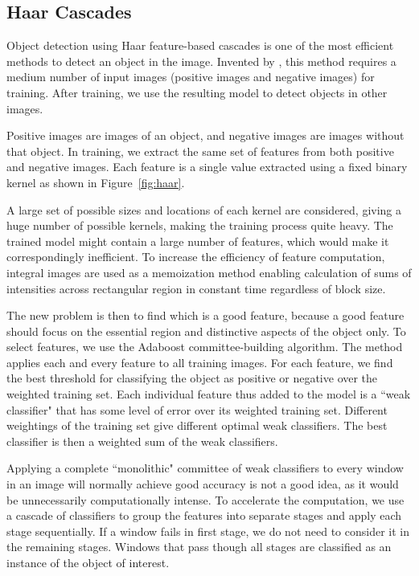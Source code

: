 \subsection{Haar Cascades}
Object detection using Haar feature-based cascades is one of the most efficient methods to detect an object in the image. Invented by , this method requires a medium number of input images (positive images and negative images) for training. After training, we use the resulting model to detect objects in other images.

Positive images are images of an object, and negative images are images without that object. In training, we extract the same set of features from both positive and negative images. Each feature is a single value extracted using a fixed binary kernel as shown in Figure~\ref{fig:haar}.

A large set of possible sizes and locations of each kernel are considered, giving a huge number of possible kernels, making the training process quite heavy. The trained model might contain a large number of features, which would make it correspondingly inefficient. To increase the efficiency of feature computation, integral images are used as a memoization method enabling calculation of sums of intensities across rectangular region in constant time regardless of block size. 

The new problem is then to find which is a good feature, because a good feature should focus on the essential region and distinctive aspects of the object only. To select features, we use the Adaboost committee-building algorithm. The method applies each and every feature to all training images. For each feature, we find the best threshold for classifying the object as positive or negative over the weighted training set. Each individual feature thus added to the model is a \textquotedblleft weak classifier" that has some level of error over its weighted training set. Different weightings of the training set give different optimal weak classifiers. The best classifier is then a weighted sum of the weak classifiers. 

Applying a complete \textquotedblleft monolithic" committee of weak classifiers to every window in an image will normally achieve good accuracy is not a good idea, as it would be unnecessarily computationally intense. To accelerate the computation, we use a cascade of classifiers to group the features into separate stages and apply each stage sequentially. If a window fails in first stage, we do not need to consider it in the remaining stages. Windows that pass though all stages are classified as an instance of the object of interest.

